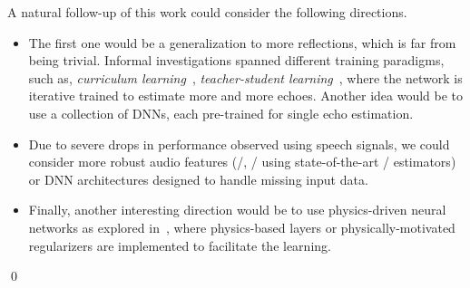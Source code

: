 \mynewline
A natural follow-up of this work could consider the following directions.
\begin{itemize}
    \item The first one would be a generalization to more reflections, which is far from being trivial.
    Informal investigations spanned different training paradigms, such as, \textit{curriculum learning}~, \textit{teacher-student learning}~, where the network is iterative trained to estimate more and more echoes.
    Another idea would be to use a collection of \acp{DNN}, each pre-trained for single echo estimation.
    \item Due to severe drops in performance observed using speech signals, we could consider more robust audio features (\eg/, \ReTF/ using state-of-the-art \ReTF/ estimators) or
    \ac{DNN} architectures designed to handle missing input data.
    \item Finally, another interesting direction would be to use physics-driven neural networks as explored in~,
    where physics-based layers or physically-motivated regularizers are implemented to facilitate the learning.
\end{itemize}
\qed

